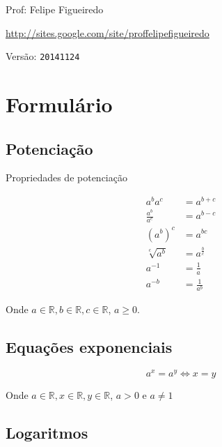 \documentclass[a4paper]{article}
\begin{document}
\parbox[c]{.825\textwidth}{\raggedright%
{Prof: Felipe Figueiredo\par}
{\url{http://sites.google.com/site/proffelipefigueiredo}}
}

Versão: \verb|20141124|



\section{Formulário}

\subsection{Potenciação}
Propriedades de potenciação

\begin{eqnarray*}
a^b a^c &= a^{b+c}\\
\frac{a^b}{a^c} &= a^{b-c}\\
(a^b)^c &= a^{bc}\\
\sqrt[c]{a^b} &= a^{\frac{b}{c}}\\
a^{-1} &= \frac{1}{a}\\
a^{-b} &= \frac{1}{a^b}
\end{eqnarray*}

Onde $a\in \mathbb{R}, b\in \mathbb{R}, c\in \mathbb{R}$, $a\ge0$.

\subsection{Equações exponenciais}

\begin{displaymath}
  a^x = a^y \Leftrightarrow x = y
\end{displaymath}

Onde $a\in \mathbb{R}, x\in \mathbb{R}, y\in \mathbb{R}$, $a>0$ e $a
\ne 1$

\subsection{Logaritmos}
\end{document}
